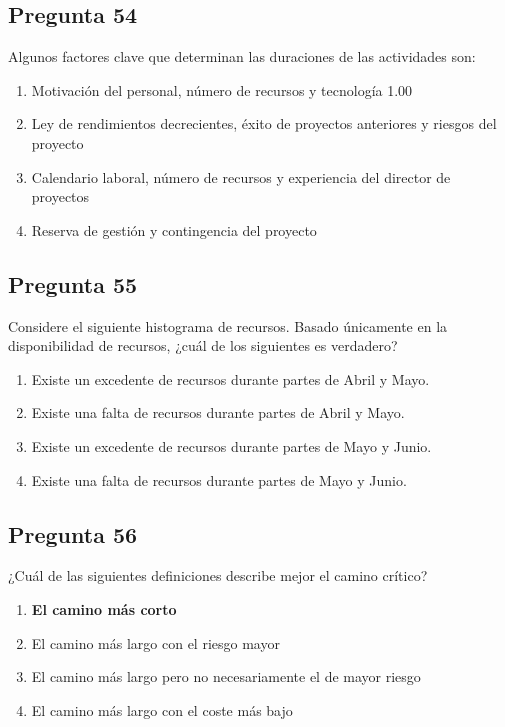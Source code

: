 \documentclass[11pt,a4paper]{article}
\begin{document}
\subsection*{Pregunta 54}
Algunos factores clave que determinan las duraciones de las actividades son:

\begin{enumerate}[label=\alph*)]
  \item Motivación del personal, número de recursos y tecnología 1.00
  \item Ley de rendimientos decrecientes, éxito de proyectos anteriores y riesgos del proyecto
  \item Calendario laboral, número de recursos y experiencia del director de proyectos
  \item Reserva de gestión y contingencia del proyecto
\end{enumerate}

\subsection*{Pregunta 55}
Considere el siguiente histograma de recursos. Basado únicamente en la disponibilidad de recursos, ¿cuál de los siguientes es verdadero?

\begin{enumerate}[label=\alph*)]
  \item Existe un excedente de recursos durante partes de Abril y Mayo.
  \item Existe una falta de recursos durante partes de Abril y Mayo.
  \item Existe un excedente de recursos durante partes de Mayo y Junio.
  \item Existe una falta de recursos durante partes de Mayo y Junio.
\end{enumerate}

\subsection*{Pregunta 56}
¿Cuál de las siguientes definiciones describe mejor el camino crítico?

\begin{enumerate}[label=\alph*)]
  \item \textbf{El camino más corto}
  \item El camino más largo con el riesgo mayor
  \item El camino más largo pero no necesariamente el de mayor riesgo
  \item El camino más largo con el coste más bajo
\end{enumerate}
\end{document}

